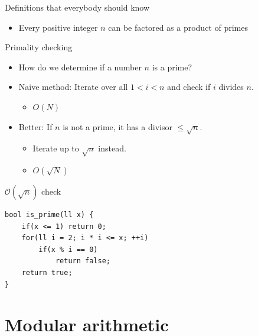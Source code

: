 \documentclass{beamer}
\begin{document}
\begin{frame}[plain]{Definitions that everybody should know}
  \vspace{15pt}
  \begin{itemize}
    \item Every positive integer $n$ can be factored as a product of primes
  \end{itemize}
\end{frame}

\begin{frame}[plain]{Primality checking}
  \vspace{20pt}
  \begin{itemize}
    \item How do we determine if a number $n$ is a prime?
    \item {\color{dark green}Naive method:} Iterate over all $1 < i < n$ and check if
      $i$ divides $n$.
      \begin{itemize}
        \item  $O(N)$
      \end{itemize}
    \item {\color{dark green}Better:} If $n$ is not a prime, it has a divisor $\leq \sqrt{n}$.
      \begin{itemize}
        \item Iterate up to $\sqrt{n}$ instead.
        \item $O(\sqrt{N})$
      \end{itemize}
  \end{itemize}
\end{frame}

\begin{frame}{$\mathcal{O}(\sqrt{n})$ check}
\begin{verbatim}
bool is_prime(ll x) {
    if(x <= 1) return 0;
    for(ll i = 2; i * i <= x; ++i)
        if(x % i == 0)
            return false;
    return true;
}
\end{verbatim}
\end{frame}

\section*{Modular arithmetic}
\end{document}
